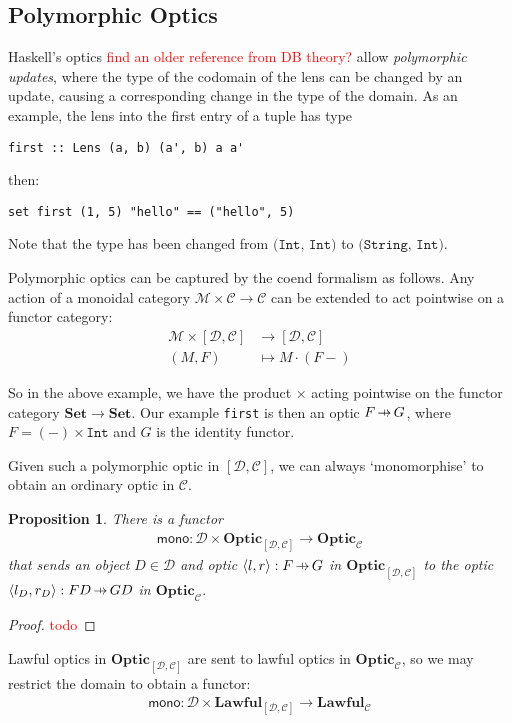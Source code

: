 \documentclass[11pt,a4paper]{article}
\theoremstyle{plain}
\newtheorem{proposition}[theorem]{Proposition}
\theoremstyle{definition}
\newcommand{\C}{\mathscr{C}}
\newcommand{\D}{\mathscr{D}}
\newcommand{\M}{\mathscr{M}}
\newcommand{\Set}{\mathbf{Set}}
\newcommand{\Optic}{\mathbf{Optic}}
\newcommand{\Lawful}{\mathbf{Lawful}}
\newcommand{\hto}{\ensuremath{\,\mathaccent\shortmid\rightarrow\,}}
\newcommand{\todo}[1]{\textcolor{red}{\small #1}}
\begin{document}
\subsection{Polymorphic Optics}
Haskell's optics \todo{find an older reference from DB theory?} allow \emph{polymorphic updates}, where the type of the codomain of the lens can be changed by an update, causing a corresponding change in the type of the domain. As an example, the lens into the first entry of a tuple has type
\begin{verbatim}
first :: Lens (a, b) (a', b) a a'
\end{verbatim}
then:
\begin{verbatim}
set first (1, 5) "hello" == ("hello", 5)
\end{verbatim}
Note that the type has been changed from $\texttt{(Int, Int)}$ to $\texttt{(String, Int)}$.

Polymorphic optics can be captured by the coend formalism as follows. Any action of a monoidal category $\M \times \C \to \C$ can be extended to act pointwise on a functor category:
\begin{align*}
  \M \times [\D, \C] &\to [\D, \C] \\
  (M, F) &\mapsto  M \cdot (F-)
\end{align*}

So in the above example, we have the product $\times$ acting pointwise on the functor category $\Set \to \Set$. Our example \texttt{first} is then an optic $F \hto G$, where $F = (-) \times \mathtt{Int}$ and $G$ is the identity functor.

Given such a polymorphic optic in $[\D, \C]$, we can always `monomorphise' to obtain an ordinary optic in $\C$.
\begin{proposition}
  There is a functor
  \begin{align*}
    \mathsf{mono} : \D \times \Optic_{[\D, \C]} \to \Optic_\C
  \end{align*}
  that sends an object $D \in \D$ and optic $\langle l, r \rangle : F \hto G$ in $\Optic_{[\D, \C]}$ to the optic $\langle l_D, r_D \rangle : FD \hto GD$ in $\Optic_\C$.
\end{proposition}
\begin{proof}
  \todo{todo}
\end{proof}

Lawful optics in $\Optic_{[\D, \C]}$ are sent to lawful optics in $\Optic_\C$,  so we may restrict the domain to obtain a functor:
\begin{align*}
  \mathsf{mono} : \D \times \Lawful_{[\D, \C]} \to \Lawful_\C
\end{align*}
\end{document}
